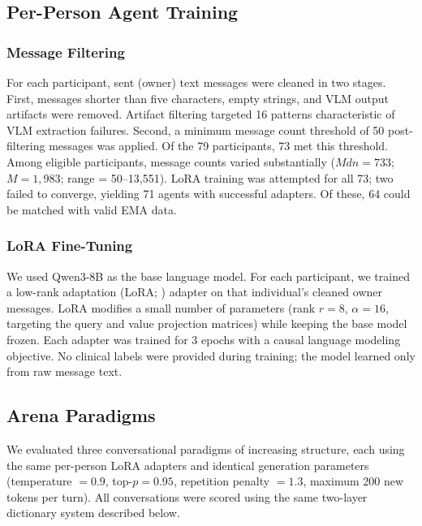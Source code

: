 \documentclass[review,12pt,authoryear]{elsarticle}
\begin{document}
\subsection{Per-Person Agent Training}

\subsubsection{Message Filtering}

For each participant, sent (owner) text messages were cleaned in two stages. First, messages shorter than five characters, empty strings, and VLM output artifacts were removed. Artifact filtering targeted 16 patterns characteristic of VLM extraction failures. Second, a minimum message count threshold of 50 post-filtering messages was applied. Of the 79 participants, 73 met this threshold. Among eligible participants, message counts varied substantially ($Mdn = 733$; $M = 1{,}983$; range = 50--13,551). LoRA training was attempted for all 73; two failed to converge, yielding 71 agents with successful adapters. Of these, 64 could be matched with valid EMA data.

\subsubsection{LoRA Fine-Tuning}

We used Qwen3-8B \citep{qwen2025qwen3} as the base language model. For each participant, we trained a low-rank adaptation (LoRA; \citealt{hu2022lora}) adapter on that individual's cleaned owner messages. LoRA modifies a small number of parameters (rank $r = 8$, $\alpha = 16$, targeting the query and value projection matrices) while keeping the base model frozen. Each adapter was trained for 3 epochs with a causal language modeling objective. No clinical labels were provided during training; the model learned only from raw message text.

\subsection{Arena Paradigms}

We evaluated three conversational paradigms of increasing structure, each using the same per-person LoRA adapters and identical generation parameters (temperature $= 0.9$, top-$p = 0.95$, repetition penalty $= 1.3$, maximum 200 new tokens per turn). All conversations were scored using the same two-layer dictionary system described below.
\end{document}
